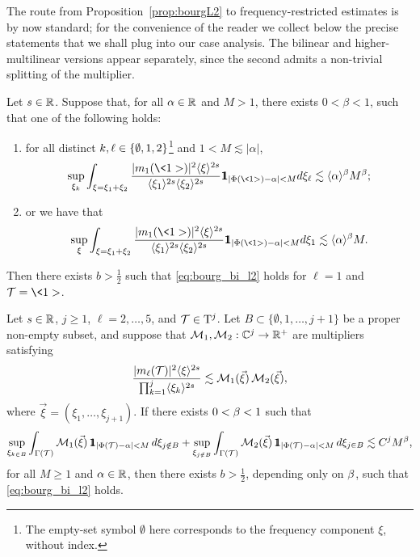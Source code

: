 The route from Proposition~\ref{prop:bourgL2} to frequency-restricted estimates is by now standard; for the convenience of the reader we collect below the precise statements that we shall plug into our case analysis. The bilinear and higher-multilinear versions appear separately, since the second admits a non-trivial splitting of the multiplier.

\begin{lemma}\label{lem:fre_bi}
Let $s\in\mathbb{R}$.
Suppose that, for all $\alpha\in \mathbb{R}$ and $M>1$, there exists $0<\beta<1$, such that one of the following holds:
\begin{enumerate}
    \item[(i)] for all distinct $ k, \ell\in\{\emptyset,1,2\}$\footnote{The empty-set symbol $\emptyset$ here corresponds to the frequency component $\xi$, without index.}
    and $1<M\lesssim |\alpha|$,
    \begin{equation}\label{eq:frequad}
        \sup_{\xi_k}\int_{\xi=\xi_1+\xi_2}
        \frac{|m_1(\<1>)|^2\jap{\xi}^{2s}}{\jap{\xi_{1}}^{2s}\jap{\xi_{2}}^{2s}}\mathbbm{1}_{|\Phi(\<1>)-\alpha|<M} d\xi_{\l} \lesssim \jap{\alpha}^\beta M^\beta;
    \end{equation}

    \item[(ii)] or we have that
    \begin{equation}\label{eq:frequad3}
        \sup_{\xi}\int_{\xi=\xi_1+\xi_2}\frac{|m_1(\<1>)|^2\jap{\xi}^{2s}}{\jap{\xi_{1}}^{2s}\jap{\xi_{2}}^{2s}}\mathbbm{1}_{|\Phi(\<1>)-\alpha|<M} d\xi_{1}  \lesssim \jap{\alpha}^\beta M.
    \end{equation}
\end{enumerate}
Then there exists $b>\frac12$ such that \eqref{eq:bourg_bi_l2} holds for $\ell=1$ and $\TT=\<1>$.
\end{lemma}

\begin{lemma}\label{lem:fre_tri}
Let $s\in\mathbb{R}$, $j\ge 1$, $\ell=2,\dots,5$, and $\mathcal{T}\in \mathrm{T}^j$. Let $B\subset \{\emptyset, 1, \ldots, j+1\}$ be a proper non-empty subset, and suppose that $\mathcal{M}_1, \mathcal{M}_2:\mathbb{C}^{j} \to \mathbb{R}^+$ are multipliers satisfying
\begin{align}
\frac{|m_\ell(\mathcal{T})|^2\langle \xi \rangle^{2s}}{\prod_{k=1}^j\langle \xi_{k} \rangle^{2s}}
\lesssim
\mathcal{M}_1(\vec\xi)\,\mathcal{M}_2(\vec\xi),
\end{align}
where $\vec\xi=(\xi_1, \ldots, \xi_{j+1})$.
If there exists $0<\beta<1$ such that
\begin{equation}\label{L2hypo}
\sup_{\xi_{k\in B}} \int_{\Gamma(\TT)} \mathcal{M}_1 (\vec\xi)\, \mathbbm{1}_{|\Phi(\TT)-\alpha|<M} \,d\xi_{j\notin B}
+ \sup_{\xi_{j\notin B}} \int_{\Gamma(\TT)} \mathcal{M}_2 (\vec\xi)\, \mathbbm{1}_{|\Phi(\TT)-\alpha|<M} \,d\xi_{j\in B}
\lesssim C^j M^\beta,
\end{equation}
for all $M\ge 1$ and $\alpha\in\mathbb{R}$,
then there exists $b>\frac12$, depending only on $\beta$, such that \eqref{eq:bourg_bi_l2} holds.
\end{lemma}

